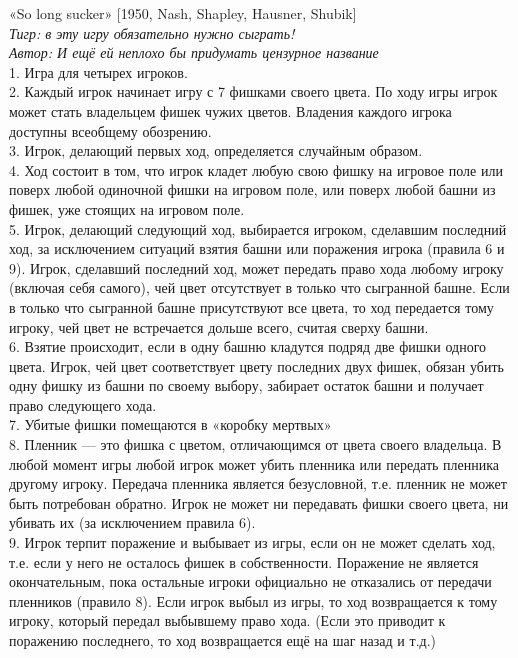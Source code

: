 \begin{problem}
 «So long sucker» [1950, Nash, Shapley, Hausner, Shubik]\\
{\it Тигр: в эту игру обязательно нужно сыграть!}\\
{\it Автор: И ещё ей неплохо бы придумать цензурное название}\\
1. Игра для четырех игроков.\\
2. Каждый игрок начинает игру с 7 фишками своего цвета. По ходу игры игрок может стать владельцем фишек чужих цветов. Владения каждого игрока доступны всеобщему обозрению.\\
3. Игрок, делающий первых ход, определяется случайным образом.\\
4. Ход состоит в том, что игрок кладет любую свою фишку на игровое поле или поверх любой одиночной фишки на игровом поле, или поверх любой башни из фишек, уже стоящих на игровом поле.\\
5. Игрок, делающий следующий ход, выбирается игроком, сделавшим последний ход, за исключением ситуаций взятия башни или поражения игрока (правила 6 и 9). Игрок, сделавший последний ход, может передать право хода любому игроку (включая себя самого), чей цвет отсутствует в только что сыгранной башне. Если в только что сыгранной башне присутствуют все цвета, то ход передается тому игроку, чей цвет не встречается дольше всего, считая сверху башни.\\
6. Взятие происходит, если в одну башню кладутся подряд две фишки одного цвета. Игрок, чей цвет соответствует цвету последних двух фишек, обязан убить одну фишку из башни по своему выбору, забирает остаток башни и получает право следующего хода.\\
7. Убитые фишки помещаются в «коробку мертвых»\\
8. Пленник — это фишка с цветом, отличающимся от цвета своего владельца. В любой момент игры любой игрок может убить пленника или передать пленника другому игроку. Передача пленника является безусловной, т.е. пленник не может быть потребован обратно. Игрок не может ни передавать фишки своего цвета, ни убивать их (за исключением правила 6).\\
9. Игрок терпит поражение и выбывает из игры, если он не может сделать ход, т.е. если у него не осталось фишек в собственности. Поражение не является окончательным, пока остальные игроки официально не отказались от передачи пленников (правило 8). Если игрок выбыл из игры, то ход возвращается к тому игроку, который передал выбывшему право хода. (Если это приводит к поражению последнего, то ход возвращается ещё на шаг назад и т.д.)\\

\end{problem}
